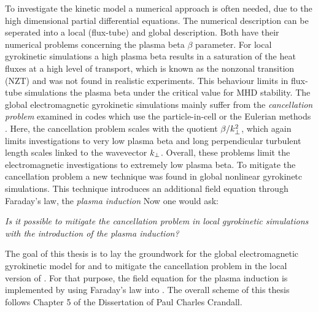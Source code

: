 To investigate the kinetic model a numerical approach is often needed, due to the high dimensional partial differential equations. The numerical description can be seperated into a local (flux-tube) and global description. Both have their numerical problems concerning the plasma beta $\beta$ parameter. For local gyrokinetic simulations a high plasma beta results in a saturation of the heat fluxes at a high level of transport, which is known as the nonzonal transition (NZT) and was not found in realistic experiments. This behaviour limits in flux-tube simulations the plasma beta under the critical value for MHD stability. The global electromagnetic gyrokinetic simulations mainly suffer from the \textit{cancellation problem} \cite{Chen2001} examined in codes which use the particle-in-cell or the Eulerian methods \cite{Cummings_PHD}. Here, the cancellation problem scales with the quotient $\beta/k_\perp^2$\cite{Mishchenko2017}, which again limits investigations to very low plasma beta and long perpendicular turbulent length scales linked to the wavevector $k_\perp$. Overall, these problems limit the electromagnetic investigations to extremely low plasma beta. To mitigate the cancellation problem a new technique was found in global nonlinear gyrokinetc simulations. This technique introduces an additional field equation through Faraday's law, the \textit{plasma induction} \cite{Crandall_PHD} \cite{Leppin_PHD} Now one would ask:

\bigskip
\textit{Is it possible to mitigate the cancellation problem in local gyrokinetic simulations with the introduction of the plasma induction?}
\bigskip

The goal of this thesis is to lay the groundwork for the global electromagnetic gyrokinetic model for {\gkw} and to mitigate the cancellation problem in the local version of {\gkw}. For that purpose, the field equation for the plasma induction is implemented by using Faraday's law into {\gkw}. The overall scheme of this thesis follows Chapter 5 of the Dissertation of Paul Charles Crandall\cite{Crandall_PHD}. 